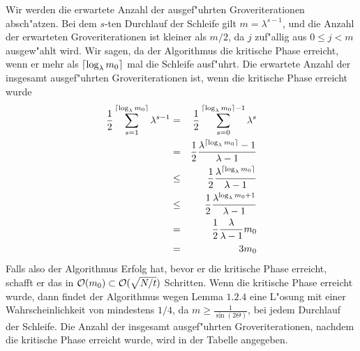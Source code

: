               Wir werden die erwartete Anzahl der ausgef"uhrten Groveriterationen absch"atzen. Bei dem $s$-ten Durchlauf der Schleife gilt  
              $m=\lambda^{s-1}$, und die Anzahl der erwarteten Groveriterationen ist kleiner als $m/2$, da $j$ zuf"allig aus $0\le j<m$ ausgew"ahlt wird. 
              Wir sagen, da\3 der Algorithmus die kritische Phase erreicht, wenn er mehr als $\lceil \log_{\lambda} m_0 \rceil$ mal die Schleife ausf"uhrt. Die 
              erwartete Anzahl der insgesamt ausgef"uhrten Groveriterationen ist, wenn die kritische Phase erreicht wurde 
              \begin{eqnarray*} 
                \frac{1}{2}\sum_{s=1}^{\lceil \log_{\lambda} m_0 \rceil} \lambda^{s-1} & =   & \frac{1}{2} \sum_{s=0}^{\lceil \log_{\lambda} m_0 \rceil - 1} \lambda^s \\ 
                                                          & =   & \frac{1}{2} \frac{\lambda^{\lceil \log_{\lambda} m_0 \rceil} - 1}{\lambda - 1} \\ 
                                                          & \le & \frac{1}{2} \frac{\lambda^{\lceil \log_{\lambda} m_0 \rceil}}{\lambda - 1} \\ 
                                                          & \le & \frac{1}{2} \frac{\lambda^{\log_{\lambda} m_0 + 1}}{\lambda - 1} \\ 
                                                          & =   & \frac{1}{2} \frac{\lambda}{\lambda - 1}m_0 \\ 
                                                          & =   & 3 m_0 
              \end{eqnarray*}  
              Falls also der Algorithmus Erfolg hat, bevor er die kritische Phase erreicht, schafft er das in ${\cal O}(m_0) \subset {\cal O}(\sqrt{N/t})$ 
              Schritten. 
              Wenn die kritische Phase erreicht wurde, dann findet der Algorithmus wegen Lemma $1.2.4$ eine L"osung mit einer Wahrscheinlichkeit von mindestens $1/4$, da 
              $m \ge \frac{1}{\sin(2\Theta)}$, bei jedem Durchlauf der Schleife. Die Anzahl der insgesamt ausgef"uhrten Groveriterationen, nachdem die 
              kritische Phase erreicht wurde, wird in der Tabelle angegeben. 
